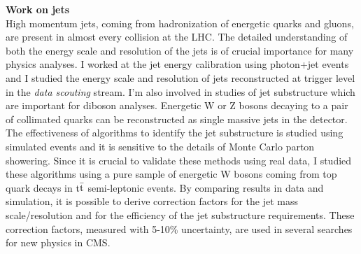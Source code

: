\documentclass[10pt, a4paper]{article}
\begin{document}
{\bf Work on jets} \\[0.5em]
High momentum jets, coming from hadronization of energetic quarks and
gluons, are present in almost every collision at the LHC. The detailed
understanding of both the energy scale and resolution of the jets is of crucial importance for
many physics analyses. I worked at the jet energy
calibration using photon+jet events and I studied the energy scale 
and resolution of jets reconstructed at trigger level in the {\it data
scouting} stream. I'm also involved in studies of jet
substructure which are important for diboson analyses. Energetic W or Z
bosons decaying to a pair of collimated quarks can be reconstructed as
single massive jets in the detector. 
The effectiveness of algorithms to identify the jet substructure 
is studied using simulated events and it is sensitive to the details
of Monte Carlo parton showering. Since it is crucial to validate 
these methods using real data, I studied these algorithms using 
a pure sample of energetic W bosons coming from top quark 
decays in t$\bar{\rm{t}}$ semi-leptonic events. 
By comparing results in data and simulation, it is
possible to derive correction factors for the jet mass
scale/resolution and for the efficiency of the jet substructure 
requirements. These correction factors, measured with 5-10\%
uncertainty, are used in several searches for new physics in CMS. \\[1em]
\end{document}
